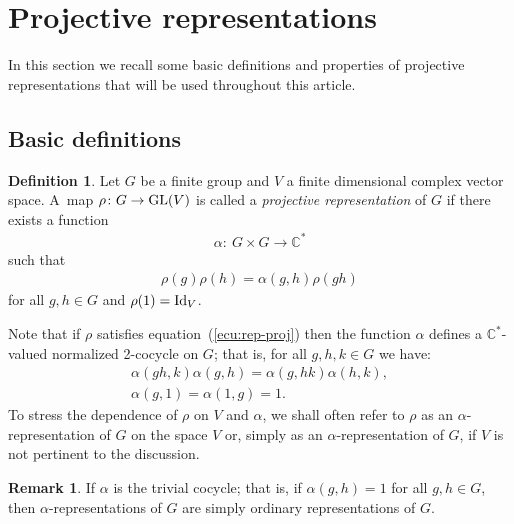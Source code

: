 \documentclass[10pt,a4paper]{amsart}
\def\C{\mathbb{C}}
\theoremstyle{definition}
\newtheorem{Def}[Th]{Definition}
\newtheorem{Rem}[Th]{Remark}
\numberwithin{equation}{section}
\begin{document}
\section{Projective representations}\label{Section 2}

In this section we recall some basic definitions and properties of projective representations that
will be used throughout this article.

\subsection{Basic definitions}

\begin{Def}
Let $G$ be a finite group and $V$ a finite dimensional complex
vector space. A~map $\rho\colon G\rightarrow {\rm GL}(V)$ is called a
\textit{projective representation} of $G$ if there exists a
function
\begin{gather*}
\alpha\colon \ G\times G \rightarrow \C^{\ast}
\end{gather*}
such that
\begin{gather}
\rho(g)\rho(h)=\alpha(g,h)\rho(gh)\label{ecu:rep-proj}
\end{gather}
for all $g,h\in G$ and $\rho(1)={\rm Id}_{V}$.
\end{Def}
	
Note that if $\rho$ satisfies equation~(\ref{ecu:rep-proj}) then the function $\alpha$ defines a
$\C^{\ast}$-valued normalized 2-cocycle on $G$; that is, for all $g,h,k\in G$ we have:
\begin{gather*}
\alpha(gh,k)\alpha(g,h)=\alpha(g,hk)\alpha(h,k),
\\
\alpha(g,1)=\alpha(1,g)=1.
\end{gather*}
To stress the dependence of $\rho$ on $V$ and $\alpha$, we shall
often refer to $\rho$ as an $\alpha$-representation of $G$
on the space $V$ or, simply as an $\alpha$-representation of
$G$, if $V$ is not pertinent to the discussion.

\begin{Rem}
If $\alpha$ is the trivial cocycle; that is, if $\alpha(g,h)=1$ for all $g,h\in G$, then
$\alpha$-representations of $G$ are simply ordinary representations of $G$.
\end{Rem}
\end{document}
